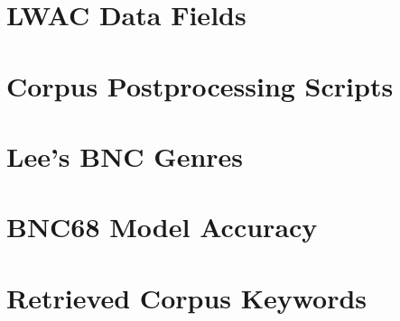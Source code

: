 

\section{LWAC Data Fields}
\label{sec:appx:fields}


\pagebreak
\section{Corpus Postprocessing Scripts}
\label{sec:appx:postprocess}


\pagebreak
\section{Lee's BNC Genres}
\label{sec:appx:sample}


\pagebreak
\section{BNC68 Model Accuracy}
\label{sec:appx:bayesianbnc68}


\pagebreak
\section{Retrieved Corpus Keywords}
\label{sec:appx:keywords}





